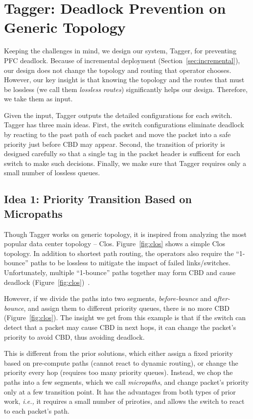 \section{Tagger: Deadlock Prevention on Generic Topology}\label{sec:generic}

Keeping the challenges in mind, we design our system, Tagger, for preventing PFC deadlock.
Because of incremental deployment (Section~\ref{sec:incremental}), our design does not change the 
topology and routing that operator chooses. However, our key insight is that knowing the topology 
and the routes that must be lossless (we call them {\em lossless routes}) significantly helps our design. 
Therefore, we take them as input. 

Given the input, Tagger outputs the detailed configurations for each switch. Tagger has three main ideas. 
First, the switch configurations eliminate deadlock by reacting to the past path of each packet and move the packet
into a safe priority just before CBD may appear. Second, the transition of priority is designed carefully so that 
a single tag in the packet header is sufficent for each switch to make such decisions.
Finally, we make sure that Tagger requires only a small number of lossless queues.

\subsection{Idea 1: Priority Transition Based on Micropaths} 

Though Tagger works on generic topology, it is inspired from analyzing the most popular data center topology -- Clos.
Figure~\ref{fig:clos} shows a simple Clos topology. In addition to shortest path routing, the operators also
require the ``1-bounce'' paths to be lossless to mitigate the impact of failed links/switches. 
Unfortunately, multiple ``1-bounce'' paths together may form CBD and cause deadlock (Figure~\ref{fig:clos})~\cite{mellanox}.

However, if we divide the paths into two segments, {\em before-bounce} and {\em after-bounce}, and assign them to
different priority queues, there is no more CBD (Figure~\ref{fig:clos}). 
The insight we get from this example is that if the switch can detect that a packet may cause CBD in next hops,
it can change the packet's priority to avoid CBD, thus avoiding deadlock. 

This is different from the prior solutions, which either assign a fixed priority based on pre-compute paths (cannot 
react to dynamic routing), or change the priority every hop (requires too many priority queues). Instead, we chop 
the paths into a few segments, which we call {\em micropaths},
and change packet's priority only at a few transition point. It has the advantages from both types of prior work,
{\em i.e.,} it requires a small number of priroties, and allows the switch to react to each packet's path.

